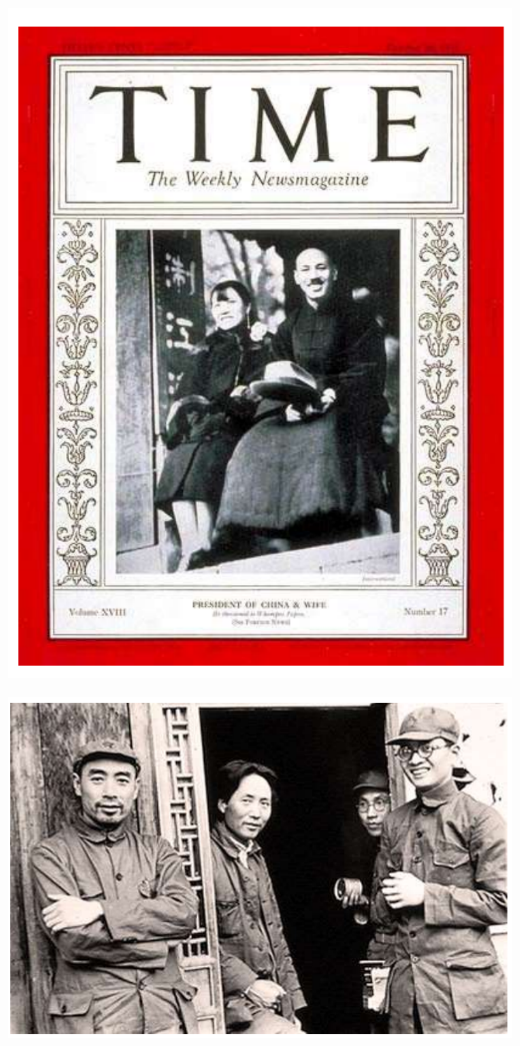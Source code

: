 \documentclass[
  10pt,
  ignorenonframetext,
]{beamer}
\begin{document}
\begin{frame}
\vspace{0.3cm}

\begin{center}\includegraphics[width=0.5\linewidth]{Figs/chiang_new} \end{center}
\end{frame}

\begin{frame}
\vspace{0.3cm}

\begin{center}\includegraphics[width=0.9\linewidth]{Figs/yanan_new} \end{center}
\end{frame}
\end{document}
